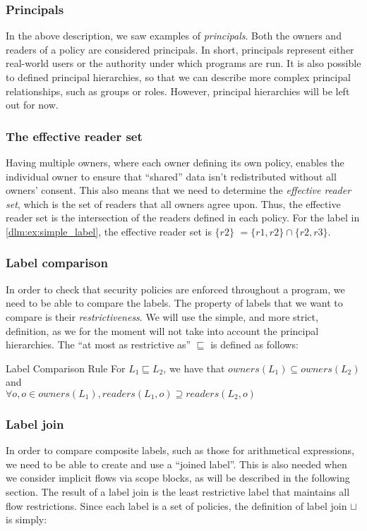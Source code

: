 \subsubsection{Principals}
In the above description, we saw examples of \textit{principals}.
Both the owners and readers of a policy are considered principals.
In short, principals represent either real-world users or the authority under which programs are run.
It is also possible to defined principal hierarchies, so that we can describe more complex principal relationships, such as groups or roles.
However, principal hierarchies will be left out for now.

\subsubsection{The effective reader set}
Having multiple owners, where each owner defining its own policy, enables the individual owner to ensure that ``shared'' data isn't redistributed without all owners' consent.
This also means that we need to determine the \emph{effective reader set}, which is the set of readers that all owners agree upon.
Thus, the effective reader set is the intersection of the readers defined in each policy.
For the label in \cref{dlm:ex:simple_label}, the effective reader set is $\{r2\}$ $= \{r1,r2\} \cap \{r2, r3\}$.

\subsubsection{Label comparison}
In order to check that security policies are enforced throughout a program, we need to be able to compare the labels.
The property of labels that we want to compare is their \emph{restrictiveness}.
We will use the simple, and more strict, definition\cite{myers1997}, as we for the moment will not take into account the principal hierarchies.
The ``at most as restrictive as'' $\sqsubseteq$ is defined as follows:

\begin{definition}{Label Comparison Rule}
  For $L_1 \sqsubseteq L_2$, we have that
  $owners(L_1) \subseteq owners(L_2)$ and\\
  $\forall o, o \in owners(L_1), readers(L_1, o) \supseteq readers(L_2, o)$
\end{definition}

\subsubsection{Label join}
In order to compare composite labels, such as those for arithmetical expressions, we need to be able to create and use a ``joined label''.
This is also needed when we consider implicit flows via scope blocks, as will be described in the following section.
The result of a label join is the least restrictive label that maintains all flow restrictions.
Since each label is a set of policies, the definition of label join $\sqcup$ is simply:

